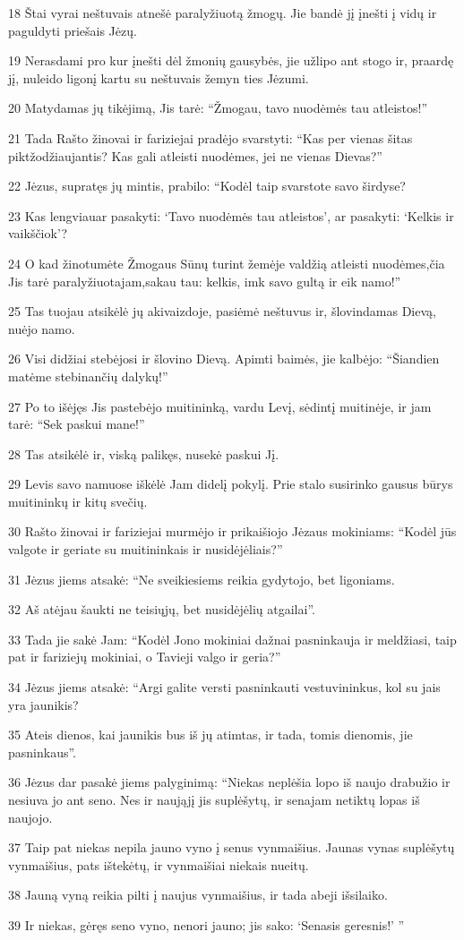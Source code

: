 \par 18 Štai vyrai neštuvais atnešė paralyžiuotą žmogų. Jie bandė jį įnešti į vidų ir paguldyti priešais Jėzų. 
\par 19 Nerasdami pro kur įnešti dėl žmonių gausybės, jie užlipo ant stogo ir, praardę jį, nuleido ligonį kartu su neštuvais žemyn ties Jėzumi. 
\par 20 Matydamas jų tikėjimą, Jis tarė: “Žmogau, tavo nuodėmės tau atleistos!” 
\par 21 Tada Rašto žinovai ir fariziejai pradėjo svarstyti: “Kas per vienas šitas piktžodžiaujantis? Kas gali atleisti nuodėmes, jei ne vienas Dievas?” 
\par 22 Jėzus, supratęs jų mintis, prabilo: “Kodėl taip svarstote savo širdyse? 
\par 23 Kas lengviau­ar pasakyti: ‘Tavo nuodėmės tau atleistos’, ar pasakyti: ‘Kelkis ir vaikščiok’? 
\par 24 O kad žinotumėte Žmogaus Sūnų turint žemėje valdžią atleisti nuodėmes,­čia Jis tarė paralyžiuotajam,­sakau tau: kelkis, imk savo gultą ir eik namo!” 
\par 25 Tas tuojau atsikėlė jų akivaizdoje, pasiėmė neštuvus ir, šlovindamas Dievą, nuėjo namo. 
\par 26 Visi didžiai stebėjosi ir šlovino Dievą. Apimti baimės, jie kalbėjo: “Šiandien matėme stebinančių dalykų!” 
\par 27 Po to išėjęs Jis pastebėjo muitininką, vardu Levį, sėdintį muitinėje, ir jam tarė: “Sek paskui mane!” 
\par 28 Tas atsikėlė ir, viską palikęs, nusekė paskui Jį. 
\par 29 Levis savo namuose iškėlė Jam didelį pokylį. Prie stalo susirinko gausus būrys muitininkų ir kitų svečių. 
\par 30 Rašto žinovai ir fariziejai murmėjo ir prikaišiojo Jėzaus mokiniams: “Kodėl jūs valgote ir geriate su muitininkais ir nusidėjėliais?” 
\par 31 Jėzus jiems atsakė: “Ne sveikiesiems reikia gydytojo, bet ligoniams. 
\par 32 Aš atėjau šaukti ne teisiųjų, bet nusidėjėlių atgailai”. 
\par 33 Tada jie sakė Jam: “Kodėl Jono mokiniai dažnai pasninkauja ir meldžiasi, taip pat ir fariziejų mokiniai, o Tavieji valgo ir geria?” 
\par 34 Jėzus jiems atsakė: “Argi galite versti pasninkauti vestuvininkus, kol su jais yra jaunikis? 
\par 35 Ateis dienos, kai jaunikis bus iš jų atimtas, ir tada, tomis dienomis, jie pasninkaus”. 
\par 36 Jėzus dar pasakė jiems palyginimą: “Niekas neplėšia lopo iš naujo drabužio ir nesiuva jo ant seno. Nes ir naująjį jis suplėšytų, ir senajam netiktų lopas iš naujojo. 
\par 37 Taip pat niekas nepila jauno vyno į senus vynmaišius. Jaunas vynas suplėšytų vynmaišius, pats ištekėtų, ir vynmaišiai niekais nueitų. 
\par 38 Jauną vyną reikia pilti į naujus vynmaišius, ir tada abeji išsilaiko. 
\par 39 Ir niekas, gėręs seno vyno, nenori jauno; jis sako: ‘Senasis geresnis!’ ”



